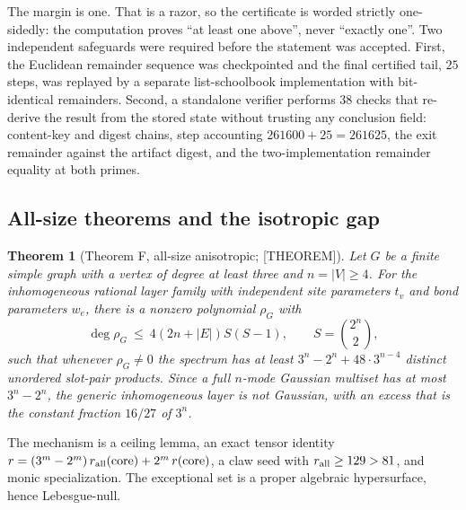\documentclass[11pt]{article}
\newtheorem{theorem}{Theorem}[section]
\theoremstyle{definition}
\begin{document}
The margin is one. That is a razor, so the certificate is worded strictly one-sidedly: the
computation proves ``at least one above'', never ``exactly one''. Two independent safeguards were
required before the statement was accepted. First, the Euclidean remainder sequence was checkpointed
and the final certified tail, $25$ steps, was replayed by a separate list-schoolbook implementation
with bit-identical remainders. Second, a standalone verifier performs $38$ checks that re-derive the
result from the stored state without trusting any conclusion field: content-key and digest chains,
step accounting $261600+25=261625$, the exit remainder against the artifact digest, and the
two-implementation remainder equality at both primes.

\subsection{All-size theorems and the isotropic gap}\label{sec:allsize}
\begin{theorem}[Theorem F, all-size anisotropic; {[THEOREM]}]\label{thm:F}
Let $G$ be a finite simple graph with a vertex of degree at least three and $n=|V|\ge4$. For the
inhomogeneous rational layer family with independent site parameters $t_v$ and bond parameters
$w_e$, there is a nonzero polynomial $\rho_G$ with
\[
\deg\rho_G\ \le\ 4(2n+|E|)S(S-1),\qquad S=\binom{2^n}{2},
\]
such that whenever $\rho_G\ne0$ the spectrum has at least $3^n-2^n+48\cdot3^{n-4}$ distinct unordered
slot-pair products. Since a full $n$-mode Gaussian multiset has at most $3^n-2^n$, the generic
inhomogeneous layer is not Gaussian, with an excess that is the constant fraction $16/27$ of $3^n$.
\end{theorem}

The mechanism is a ceiling lemma, an exact tensor identity
$r=(3^m-2^m)\,r_{\rm all}(\text{core})+2^m\,r(\text{core})$, a claw seed with
$r_{\rm all}\ge129>81$, and monic specialization. The exceptional set is a proper algebraic
hypersurface, hence Lebesgue-null.
\end{document}
